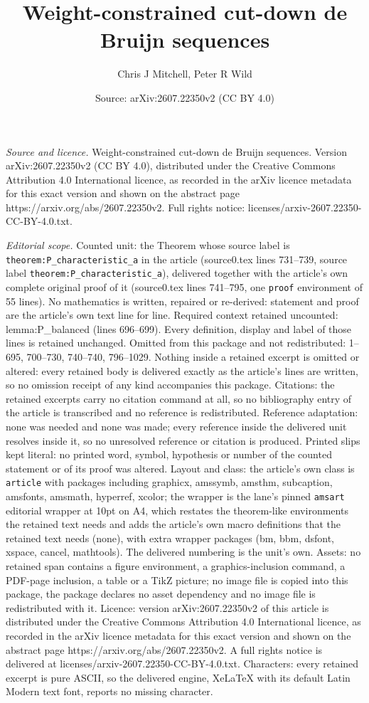 \documentclass[10pt,a4paper]{amsart}
\title[Weight-constrained cut-down de Bruijn sequences]{Weight-constrained cut-down de Bruijn sequences}
\author{Chris J Mitchell, Peter R Wild}
\date{Source: arXiv:2607.22350v2 (CC BY 4.0)}
\begin{document}
\maketitle

\noindent\emph{Source and licence.} Weight-constrained cut-down de Bruijn sequences. Version arXiv:2607.22350v2 (CC BY 4.0), distributed under the Creative Commons Attribution 4.0 International licence, as recorded in the arXiv licence metadata for this exact version and shown on the abstract page https://arxiv.org/abs/2607.22350v2. Full rights notice: licenses/arxiv-2607.22350-CC-BY-4.0.txt.\par\smallskip

\noindent\textit{Editorial scope.} Counted unit: the Theorem whose source label is \texttt{theorem:P\_characteristic\_a} in the article (source0.tex lines 731--739, source label \texttt{theorem:P\_characteristic\_a}), delivered together with the article's own complete original proof of it (source0.tex lines 741--795, one \texttt{proof} environment of 55 lines). No mathematics is written, repaired or re-derived: statement and proof are the article's own text line for line. Required context retained uncounted: lemma:P\_balanced (lines 696--699). Every definition, display and label of those lines is retained unchanged. Omitted from this package and not redistributed: 1--695, 700--730, 740--740, 796--1029. Nothing inside a retained excerpt is omitted or altered: every retained body is delivered exactly as the article's lines are written, so no omission receipt of any kind accompanies this package. Citations: the retained excerpts carry no citation command at all, so no bibliography entry of the article is transcribed and no reference is redistributed. Reference adaptation: none was needed and none was made; every reference inside the delivered unit resolves inside it, so no unresolved reference or citation is produced. Printed slips kept literal: no printed word, symbol, hypothesis or number of the counted statement or of its proof was altered. Layout and class: the article's own class is \texttt{article} with packages including graphicx, amssymb, amsthm, subcaption, amsfonts, amsmath, hyperref, xcolor; the wrapper is the lane's pinned \texttt{amsart} editorial wrapper at 10pt on A4, which restates the theorem-like environments the retained text needs and adds the article's own macro definitions that the retained text needs (none), with extra wrapper packages (bm, bbm, dsfont, xspace, cancel, mathtools). The delivered numbering is the unit's own. Assets: no retained span contains a figure environment, a graphics-inclusion command, a PDF-page inclusion, a table or a TikZ picture; no image file is copied into this package, the package declares no asset dependency and no image file is redistributed with it. Licence: version arXiv:2607.22350v2 of this article is distributed under the Creative Commons Attribution 4.0 International licence, as recorded in the arXiv licence metadata for this exact version and shown on the abstract page https://arxiv.org/abs/2607.22350v2. A full rights notice is delivered at licenses/arxiv-2607.22350-CC-BY-4.0.txt. Characters: every retained excerpt is pure ASCII, so the delivered engine, XeLaTeX with its default Latin Modern text font, reports no missing character.
\end{document}
